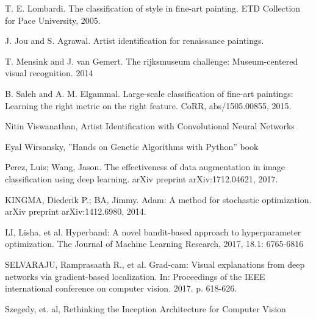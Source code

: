 \begin{thebibliography}{1}


T. E. Lombardi. The classification of style in fine-art painting. ETD Collection for Pace University, 2005.

J. Jou and S. Agrawal. Artist identification for renaissance paintings.

T. Mensink and J. van Gemert. The rijksmuseum challenge: Museum-centered visual recognition. 2014

B. Saleh and A. M. Elgammal. Large-scale classification of fine-art paintings: Learning the right metric on the right feature. CoRR, abs/1505.00855, 2015.

Nitin Viswanathan, Artist Identification with Convolutional Neural Networks

Eyal Wirsansky, ”Hands on Genetic Algorithms with Python” book

Perez, Luis; Wang, Jason. The effectiveness of data augmentation in image classification using deep learning. arXiv preprint arXiv:1712.04621, 2017.

KINGMA, Diederik P.; BA, Jimmy. Adam: A method for stochastic optimization. arXiv preprint arXiv:1412.6980, 2014.

LI, Lisha, et al. Hyperband: A novel bandit-based approach to hyperparameter optimization. The Journal
of Machine Learning Research, 2017, 18.1: 6765-6816

SELVARAJU, Ramprasaath R., et al. Grad-cam: Visual explanations from deep networks via gradient-based localization. In: Proceedings of the IEEE international conference on computer vision. 2017. p. 618-626.

Szegedy, et. al, Rethinking the Inception Architecture for Computer Vision

\end{thebibliography}
